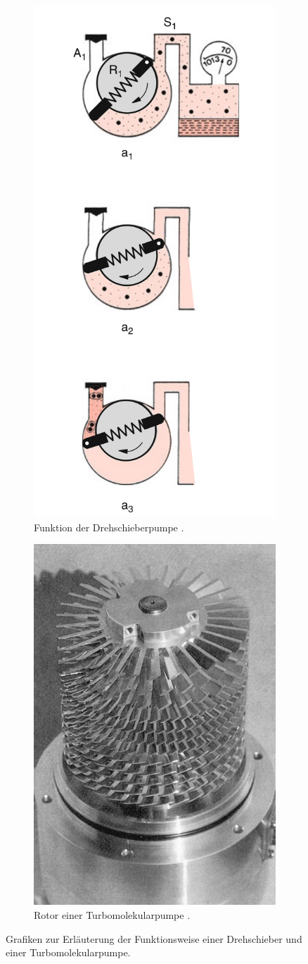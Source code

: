 \begin{figure}
  \centering
  \begin{subfigure}{0.49\textwidth}
    \centering
    \includegraphics[height = \textwidth]{theorie_plots/drehschieber.png}
    \caption{Funktion der Drehschieberpumpe \cite{dem1}.}
    \label{fig: drehschieber}
\end{subfigure}
\begin{subfigure}{0.49\textwidth}
  \centering
  \includegraphics[height = \textwidth]{theorie_plots/turbo_pumpe.png}
  \caption{Rotor einer Turbomolekularpumpe \cite{dem1}.}
  \label{fig: turbo}
\end{subfigure}
\caption{Grafiken zur Erläuterung der Funktionsweise einer Drehschieber und einer Turbomolekularpumpe.}
\label{fig: turbo_drehschieber}
\end{figure}
\FloatBarrier

